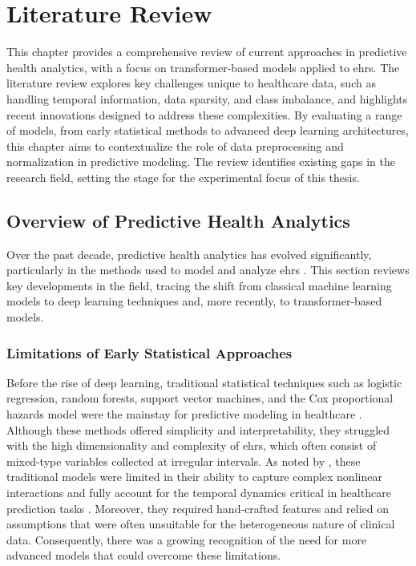 \chapter{Literature Review}
\label{ch:literature_review}
\glsresetall

This chapter provides a comprehensive review of current approaches in predictive health analytics, with a focus on transformer-based models applied to \glspl{ehr}. The literature review explores key challenges unique to healthcare data, such as handling temporal information, data sparsity, and class imbalance, and highlights recent innovations designed to address these complexities. By evaluating a range of models, from early statistical methods to advanced deep learning architectures, this chapter aims to contextualize the role of data preprocessing and normalization in predictive modeling. The review identifies existing gaps in the research field, setting the stage for the experimental focus of this thesis.


\section{Overview of Predictive Health Analytics}

Over the past decade, predictive health analytics has evolved significantly, particularly in the methods used to model and analyze \glspl{ehr} \cite{yang2020combining,yang2023threshold}. This section reviews key developments in the field, tracing the shift from classical machine learning models to deep learning techniques and, more recently, to transformer-based models.


\subsection*{Limitations of Early Statistical Approaches}

Before the rise of deep learning, traditional statistical techniques such as logistic regression, random forests, support vector machines, and the Cox proportional hazards model were the mainstay for predictive modeling in healthcare \cite{emmert2023elements,emmert2019introduction}. Although these methods offered simplicity and interpretability, they struggled with the high dimensionality and complexity of \glspl{ehr}, which often consist of mixed-type variables collected at irregular intervals. As noted by \citeauthor{DeepLearningElectronic2020}, these traditional models were limited in their ability to capture complex nonlinear interactions and fully account for the temporal dynamics critical in healthcare prediction tasks \cite{DeepLearningElectronic2020}. Moreover, they required hand-crafted features and relied on assumptions that were often unsuitable for the heterogeneous nature of clinical data. Consequently, there was a growing recognition of the need for more advanced models that could overcome these limitations.

